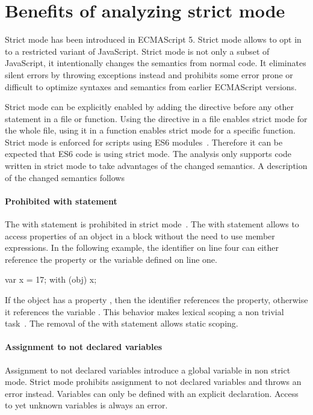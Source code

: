 \section{Benefits of analyzing strict mode}
Strict mode has been introduced in ECMAScript 5. Strict mode allows to opt in to a restricted variant of JavaScript. Strict mode is not only a subset of JavaScript, it intentionally changes the semantics from normal code. It eliminates silent errors by throwing exceptions instead and prohibits some error prone or difficult to optimize syntaxes and semantics from earlier ECMAScript versions. 

Strict mode can be explicitly enabled by adding the  directive before any other statement in a file or function. Using the directive in a file enables strict mode for the whole file, using it in a function enables strict mode for a specific function. Strict mode is enforced for scripts using ES6 modules~\cite[10.2.1]{Ecma2015}. Therefore it can be expected that ES6 code is using strict mode. The analysis only supports code written in strict mode to take advantages of the changed semantics. A description of the changed semantics follows

\paragraph{Prohibited with statement}
The with statement is prohibited in strict mode~\cite[Annex C]{Ecma2015}. The with statement allows to access properties of an object in a block without the need to use member expressions. In the following example, the identifier  on line four can either reference the property  or the variable  defined on line one.

\begin{javascriptcode}
var x = 17;
with (obj)
{
	x;
}
\end{javascriptcode}

If the object  has a property , then the identifier references the property, otherwise it references the variable . This behavior makes lexical scoping a non trivial task~\cite{JensenMollerThiemann2009}. The removal of the with statement allows static scoping.

\paragraph{Assignment to not declared variables}
Assignment to not declared variables introduce a global variable in non strict mode. Strict mode prohibits assignment to not declared variables and throws an error instead. Variables can only be defined with an explicit declaration. Access to yet unknown variables is always an error.